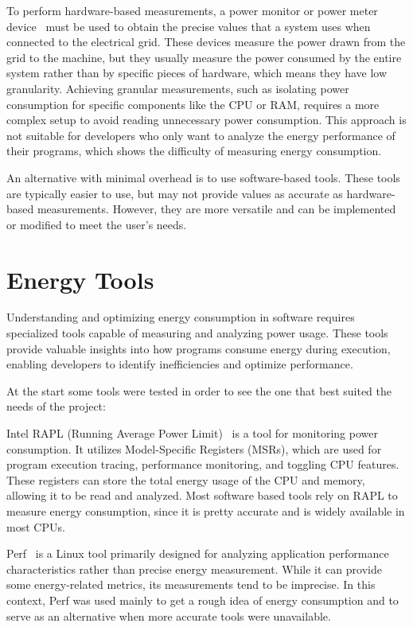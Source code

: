 To perform hardware-based measurements, a power monitor or power meter device~\cite{hackenberg2013power,ge2009powerpack} must be used to obtain the precise values that a system uses when connected to the electrical grid. These devices measure the power drawn from the grid to the machine, but they usually measure the power consumed by the entire system rather than by specific pieces of hardware, which means they have low granularity. Achieving granular measurements, such as isolating power consumption for specific components like the CPU or RAM, requires a more complex setup to avoid reading unnecessary power consumption. This approach is not suitable for developers who only want to analyze the energy performance of their programs, which shows the difficulty of measuring energy consumption.

An alternative with minimal overhead is to use software-based tools. These tools are typically easier to use, but may not provide values as accurate as hardware-based measurements. However, they are more versatile and can be implemented or modified to meet the user's needs. 


\section{Energy Tools} \label{sec:background_energy}

Understanding and optimizing energy consumption in software requires specialized tools capable of measuring and analyzing power usage. These tools provide valuable insights into how programs consume energy during execution, enabling developers to identify inefficiencies and optimize performance.

At the start some tools were tested in order to see the one that best suited the needs of the project:

Intel RAPL (Running Average Power Limit)~\cite{intel_rapl} is a tool for monitoring power consumption. It utilizes Model-Specific Registers (MSRs), which are used for program execution tracing, performance monitoring, and toggling CPU features. These registers can store the total energy usage of the CPU and memory, allowing it to be read and analyzed. Most software based tools rely on RAPL to measure energy consumption, since it is pretty accurate and is widely available in most CPUs.

Perf~\cite{perfwiki_main} is a Linux tool primarily designed for analyzing application performance characteristics rather than precise energy measurement. While it can provide some energy-related metrics, its measurements tend to be imprecise. In this context, Perf was used mainly to get a rough idea of energy consumption and to serve as an alternative when more accurate tools were unavailable.

